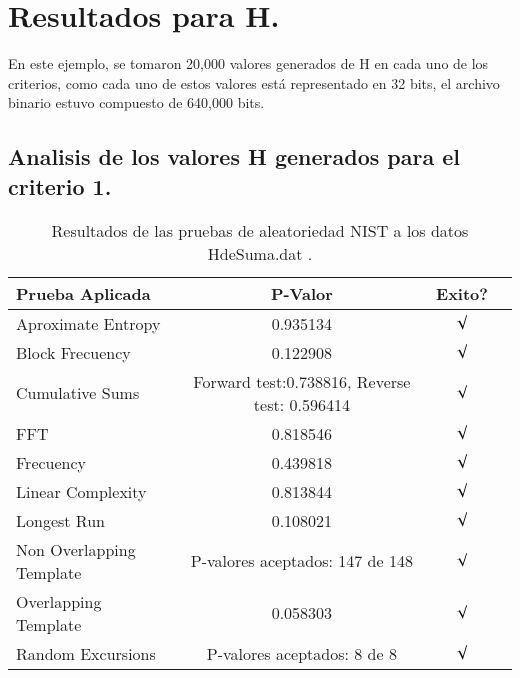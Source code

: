 \documentclass[12pt,3p]{elsarticle}
\begin{document}
\section{Resultados para H.}

En este ejemplo, se tomaron 20,000 valores generados de H en cada uno de los criterios, como cada uno de estos valores está representado en 32 bits, el archivo binario estuvo compuesto de 640,000 bits.

\subsection{Analisis de los valores H generados para el criterio 1.}

\begin{table}[H]
\caption{Resultados de las pruebas de aleatoriedad NIST a los datos HdeSuma.dat .}
\label{sample-table}
\vskip 0.15in
\begin{center}
\begin{small}
\begin{sc}
\begin{tabular}{lccr}
\hline

Prueba Aplicada &  P-Valor & Exito? \\
\hline

Aproximate Entropy    &   0.935134 & $\surd$ \\

Block Frecuency  & 0.122908  &  $\surd$  \\

Cumulative Sums    &   Forward test:0.738816, Reverse test: 0.596414  & $\surd$ \\

FFT    &   0.818546 &   $\surd$      \\

Frecuency     &  0.439818 &  $\surd$   \\

Linear Complexity      &  0.813844  & $\surd$ \\

Longest Run      &  0.108021 &    $\surd$      \\

Non Overlapping Template      & P-valores aceptados: 147 de 148    &     $\surd$          \\

Overlapping Template      &  0.058303  &        $\surd$       \\

Random Excursions      &  P-valores aceptados: 8 de 8  &      $\surd$          \\


\end{tabular}
\end{sc}
\end{small}
\end{center}
\end{table}
\end{document}
